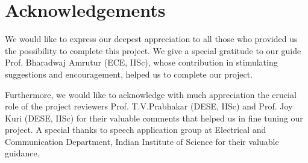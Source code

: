 \chapter*{Acknowledgements}
We would like to express our deepest appreciation to all those who provided us the possibility to complete this project.  We give a special gratitude to our guide Prof. Bharadwaj Amrutur (ECE, IISc), whose contribution in stimulating suggestions and encouragement, helped us to complete our project.

Furthermore, we would like to acknowledge with much appreciation the crucial role of the project reviewers Prof. T.V.Prabhakar (DESE, IISc) and Prof. Joy Kuri (DESE, IISc) for their valuable comments that helped us in fine tuning our project. A special thanks to speech application group at Electrical and Communication Department, Indian Institute of Science for their valuable guidance.

